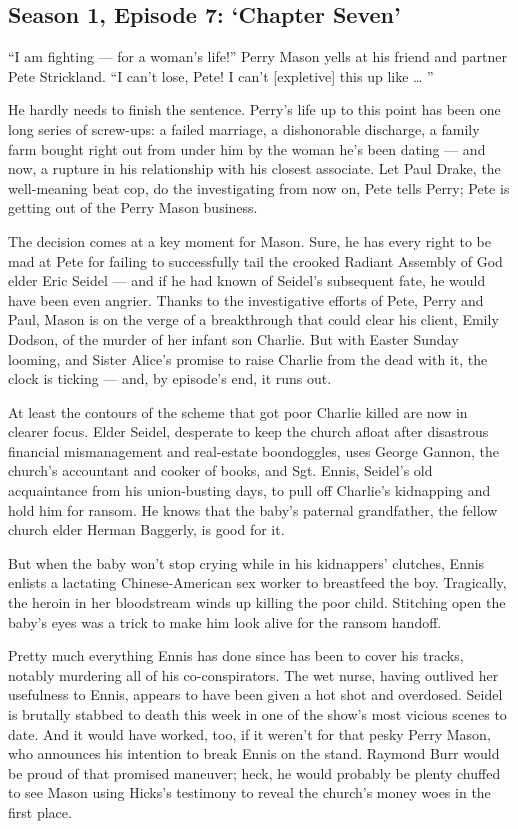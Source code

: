 \hypertarget{season-1-episode-7-chapter-seven}{%
\subsection{Season 1, Episode 7: `Chapter
Seven'}\label{season-1-episode-7-chapter-seven}}

``I am fighting --- for a woman's life!'' Perry Mason yells at his
friend and partner Pete Strickland. ``I can't lose, Pete! I can't
{[}expletive{]} this up like \ldots{} ''

He hardly needs to finish the sentence. Perry's life up to this point
has been one long series of screw-ups: a failed marriage, a dishonorable
discharge, a family farm bought right out from under him by the woman
he's been dating --- and now, a rupture in his relationship with his
closest associate. Let Paul Drake, the well-meaning beat cop, do the
investigating from now on, Pete tells Perry; Pete is getting out of the
Perry Mason business.

The decision comes at a key moment for Mason. Sure, he has every right
to be mad at Pete for failing to successfully tail the crooked Radiant
Assembly of God elder Eric Seidel --- and if he had known of Seidel's
subsequent fate, he would have been even angrier. Thanks to the
investigative efforts of Pete, Perry and Paul, Mason is on the verge of
a breakthrough that could clear his client, Emily Dodson, of the murder
of her infant son Charlie. But with Easter Sunday looming, and Sister
Alice's promise to raise Charlie from the dead with it, the clock is
ticking --- and, by episode's end, it runs out.

At least the contours of the scheme that got poor Charlie killed are now
in clearer focus. Elder Seidel, desperate to keep the church afloat
after disastrous financial mismanagement and real-estate boondoggles,
uses George Gannon, the church's accountant and cooker of books, and
Sgt. Ennis, Seidel's old acquaintance from his union-busting days, to
pull off Charlie's kidnapping and hold him for ransom. He knows that the
baby's paternal grandfather, the fellow church elder Herman Baggerly, is
good for it.

But when the baby won't stop crying while in his kidnappers' clutches,
Ennis enlists a lactating Chinese-American sex worker to breastfeed the
boy. Tragically, the heroin in her bloodstream winds up killing the poor
child. Stitching open the baby's eyes was a trick to make him look alive
for the ransom handoff.

Pretty much everything Ennis has done since has been to cover his
tracks, notably murdering all of his co-conspirators. The wet nurse,
having outlived her usefulness to Ennis, appears to have been given a
hot shot and overdosed. Seidel is brutally stabbed to death this week in
one of the show's most vicious scenes to date. And it would have worked,
too, if it weren't for that pesky Perry Mason, who announces his
intention to break Ennis on the stand. Raymond Burr would be proud of
that promised maneuver; heck, he would probably be plenty chuffed to see
Mason using Hicks's testimony to reveal the church's money woes in the
first place.

